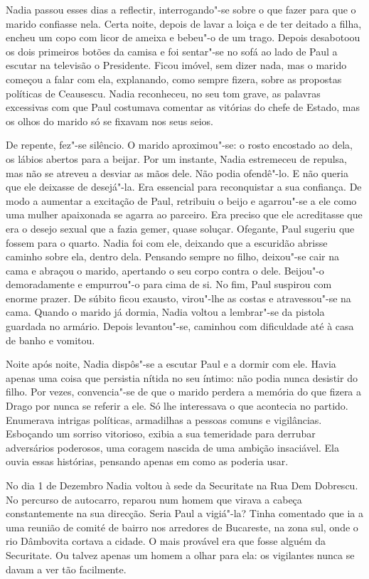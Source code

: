 Nadia passou esses dias a reflectir, interrogando"-se sobre o que fazer
para que o marido confiasse nela. Certa noite, depois de lavar a loiça e
de ter deitado a filha, encheu um copo com licor de ameixa e bebeu"-o de
um trago. Depois desabotoou os dois primeiros botões da camisa e foi
sentar"-se no sofá ao lado de Paul a escutar na
televisão o Presidente. Ficou imóvel, sem dizer nada, mas o marido
começou a falar com ela, explanando, como sempre fizera, sobre as
propostas políticas de Ceausescu. Nadia reconheceu, no seu tom grave, as
palavras excessivas com que Paul costumava comentar as vitórias do
chefe de Estado, mas os olhos do marido só se fixavam nos seus seios.

De repente, fez"-se silêncio. O marido aproximou"-se: o rosto encostado ao
dela, os lábios abertos para a beijar. Por um instante, Nadia estremeceu
de repulsa, mas não se atreveu a desviar as mãos dele. Não podia
ofendê"-lo. E não queria que ele deixasse de desejá"-la. Era essencial
para reconquistar a sua confiança. De modo a aumentar a excitação de
Paul, retribuiu o beijo e agarrou"-se a ele como uma mulher apaixonada se
agarra ao parceiro. Era preciso que ele acreditasse que era o desejo
sexual que a fazia gemer, quase soluçar. Ofegante, Paul sugeriu que
fossem para o quarto. Nadia foi com ele, deixando que a escuridão
abrisse caminho sobre ela, dentro dela. Pensando sempre no filho,
deixou"-se cair na cama e abraçou o marido, apertando o seu corpo contra
o dele. Beijou"-o demoradamente e empurrou"-o para cima de si. No fim,
Paul suspirou com enorme prazer. De súbito ficou exausto, virou"-lhe as
costas e atravessou"-se na cama. Quando o marido já dormia, Nadia voltou
a lembrar"-se da pistola guardada no armário. Depois levantou"-se,
caminhou com dificuldade até à casa de banho e vomitou.

Noite após noite, Nadia dispôs"-se a escutar Paul e a
dormir com ele. Havia apenas uma coisa que persistia nítida no seu
íntimo: não podia nunca desistir do filho. Por
vezes, convencia"-se de que o marido perdera a memória do que fizera a
Drago por nunca se referir a ele. Só lhe interessava o que acontecia
no partido. Enumerava intrigas políticas, armadilhas a pessoas comuns e
vigilâncias. Esboçando um sorriso vitorioso, exibia a sua temeridade
para derrubar adversários poderosos, uma coragem nascida de uma ambição
insaciável. Ela ouvia essas histórias, pensando apenas em como as
poderia usar.

\bigskip

No dia 1 de Dezembro Nadia voltou à sede da Securitate na Rua Dem
Dobrescu. No percurso de autocarro, reparou num homem que virava a
cabeça constantemente na sua direcção. Seria Paul a vigiá"-la? Tinha
comentado que ia a uma reunião de comité de bairro nos arredores de
Bucareste, na zona sul, onde o rio Dâmbovita cortava a cidade. O mais
provável era que fosse alguém da Securitate. Ou talvez apenas um homem
a olhar para ela: os vigilantes nunca se davam a ver tão facilmente.

